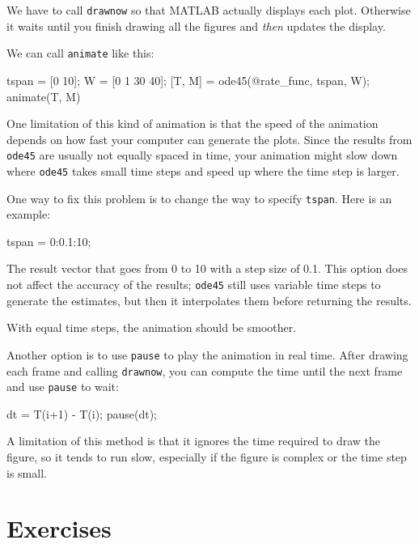 We have to call {\tt drawnow} so
that MATLAB actually displays each plot.  Otherwise it waits
until you finish drawing all the figures and {\em then} updates
the display.

We can call {\tt animate} like this:

\begin{code}
    tspan = [0 10];
    W = [0 1 30 40];
    [T, M] = ode45(@rate_func, tspan, W);
    animate(T, M)
\end{code}

One limitation of this kind of animation is that the speed
of the animation depends on how fast your computer can generate
the plots.  Since the results from {\tt ode45} are usually not
equally spaced in time, your animation might slow down where
{\tt ode45} takes small time steps and speed up where the time
step is larger.


One way to fix this problem is to change the way to specify {\tt tspan}.
Here is an example:

\begin{code}
    tspan = 0:0.1:10;
\end{code}

The result vector that goes from 0 to 10 with a
step size of 0.1.  This option does not affect the accuracy of the results; {\tt ode45} still uses variable time steps to generate the estimates, but then it interpolates them before returning the results.


With equal time steps, the animation should be smoother.

Another option is to use {\tt pause} to play the animation in
real time.  After drawing each frame and calling
{\tt drawnow}, you can compute the time
until the next frame and use {\tt pause} to wait:

\begin{code}
    dt = T(i+1) - T(i);
    pause(dt);
\end{code}

A limitation of this method is that it ignores the time required to
draw the figure, so it tends to run slow, especially if the figure is
complex or the time step is small.


\section{Exercises}


